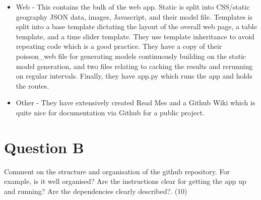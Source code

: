 \documentclass{scrreprt}
\begin{document}
\begin{itemize}
	\item Web  - This contains the bulk of the web app. Static is split into CSS/static geography JSON data, images, Javascript, and their model file. Templates is split into a base template dictating the layout of the overall web page, a table template, and a time slider template. They use template inheritance to avoid repeating code which is a good practice. They have a copy of their poisson\_web file for generating models continuously building on the static model generation, and two files relating to caching the results and rerunning on regular intervals. Finally, they have app.py which runs the app and holds the routes.
	\item Other - They have extensively created Read Mes and a Github Wiki which is quite nice for documentation via Github for a public project.
\end{itemize}

\pagebreak
\section{Question B}\label{QB}
Comment on the structure and organisation of the github repository. For example, is it well organised? Are the instructions clear for getting the app up and running? Are the dependencies clearly described?. (10)\\
\\
\end{document}
